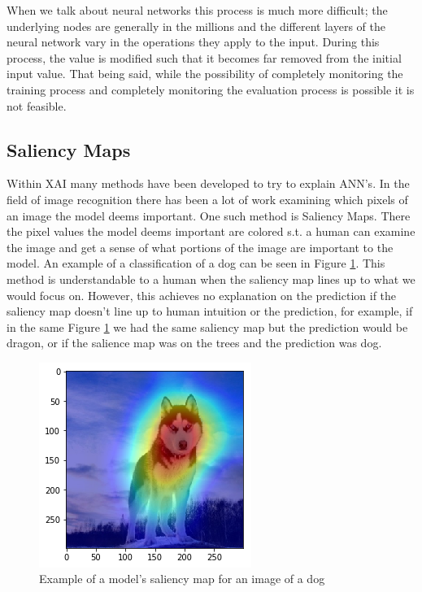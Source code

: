 When we talk about neural networks this process is much more difficult; the underlying nodes
are generally in the millions and the different layers of the neural network vary in the operations they apply to the input. During this process, the value is modified such that it becomes far removed from the initial input value. That being said, while the possibility of completely monitoring the training process and completely monitoring the evaluation process is possible it is not feasible.


\subsection{Saliency Maps}

Within XAI many methods have been developed to try to explain
ANN's. In the field of image recognition there has been a lot of work examining which
pixels of an image the model deems important. One such method is Saliency Maps\cite{Koch:saliency}. There the pixel values the model
deems important are colored s.t. a human can examine the image and get a
sense of what portions of the image are important to the model. An example of
a classification of a dog can be seen in Figure \ref{fig:dog_saliency}. This method is understandable to a human when the saliency map lines up to what we would focus on. However, this achieves no explanation on the prediction if the saliency map doesn't line up to human intuition or the prediction, for example, if in the same Figure \ref{fig:dog_saliency} we had the same saliency map but the prediction would be dragon, or if the salience map was on the trees and the prediction was dog.

\begin{figure}[]
	\centering
	\includegraphics[width=.5\textwidth]{graphics/dog_saliency}
	\caption{Example of a model's saliency map for an image of a dog}
	\label{fig:dog_saliency}
\end{figure}

